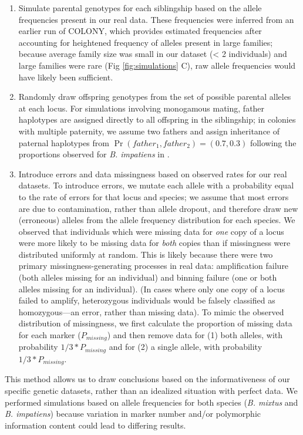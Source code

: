 \documentclass[12pt]{article}
\begin{document}
\begin{enumerate}
\item Simulate parental genotypes for each siblingship based on the allele frequencies present in our real data. These frequencies were inferred from an earlier run of COLONY, which provides estimated frequencies after accounting for heightened frequency of alleles present in large families; because average family size was small in our dataset (< 2 individuals) and large families were rare (Fig \ref{fig:simulations} C), raw allele frequencies would have likely been sufficient.

\item Randomly draw offspring genotypes from the set of possible parental alleles at each locus. For simulations involving monogamous mating, father haplotypes are assigned directly to all offspring in the siblingship; in colonies with multiple paternity, we assume two fathers and assign inheritance of paternal haplotypes from $\Pr(father_1, father_2) = (0.7, 0.3)$ following the proportions observed for \emph{B. impatiens} in \textcite{birdMatingFrequencyEstimation2024}.

\item Introduce errors and data missingness based on observed rates for our real datasets. To introduce errors, we mutate each allele with a probability equal to the rate of errors for that locus and species; we assume that most errors are due to contamination, rather than allele dropout, and therefore draw new (erroneous) alleles from the allele frequency distribution for each species. We observed that individuals which were missing data for \emph{one} copy of a locus were more likely to be missing data for \emph{both} copies than if missingness were distributed uniformly at random. This is likely because there were two primary missingness-generating processes in real data: amplification failure (both alleles missing for an individual) and binning failure (one or both alleles missing for an individual). (In cases where only one copy of a locus failed to amplify, heterozygous individuals would be falsely classified as homozygous---an error, rather than missing data). To mimic the observed distribution of missingness, we first calculate the proportion of missing data for each marker ($P_{missing}$) and then remove data for (1) both alleles, with probability $1/3 * P_{missing}$ and for (2) a single allele, with probability $1/3 * P_{missing}$.
\end{enumerate}

This method allows us to draw conclusions based on the informativeness of our specific genetic datasets, rather than an idealized situation with perfect data. We performed simulations based on allele frequencies for both species (\emph{B. mixtus} and \emph{B. impatiens}) because variation in marker number and/or polymorphic information content could lead to differing results.
\end{document}
